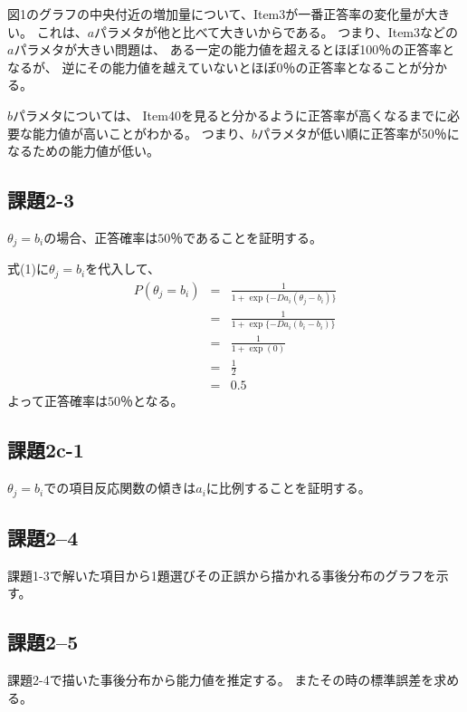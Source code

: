 \documentclass[12pt]{jarticle}
\begin{document}
図1のグラフの中央付近の増加量について、Item3が一番正答率の変化量が大きい。
これは、$a$パラメタが他と比べて大きいからである。
つまり、Item3などの$a$パラメタが大きい問題は、
ある一定の能力値を超えるとほぼ100％の正答率となるが、
逆にその能力値を越えていないとほぼ0％の正答率となることが分かる。

$b$パラメタについては、
Item40を見ると分かるように正答率が高くなるまでに必要な能力値が高いことがわかる。
つまり、$b$パラメタが低い順に正答率が50％になるための能力値が低い。

\subsection{課題2-3}
\begin{shadebox}
    $\theta_j=b_i$の場合、正答確率は$50％$であることを証明する。
\end{shadebox}

式(1)に$\theta_j=b_i$を代入して、
\begin{eqnarray*}
    P(\theta_j=b_i)&=&\frac{1}{1+\exp\{-Da_i(\theta_j -b_i)\}}\\
    &=&\frac{1}{1+\exp\{-Da_i(b_i -b_i)\}}\\
    &=&\frac{1}{1+\exp(0)}\\
    &=&\frac{1}{2}\\
    &=&0.5
\end{eqnarray*}
よって正答確率は$50％$となる。

\subsection{課題2c-1}
\begin{shadebox}
    $\theta_j=b_i$での項目反応関数の傾きは$a_i$に比例することを証明する。
\end{shadebox}

\clearpage
\subsection{課題2–4}
\begin{shadebox}
    課題1-3で解いた項目から1題選びその正誤から描かれる事後分布のグラフを示す。
\end{shadebox}

\subsection{課題2–5}
\begin{shadebox}
    課題2-4で描いた事後分布から能力値を推定する。
    またその時の標準誤差を求める。
\end{shadebox}
\end{document}

